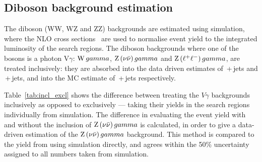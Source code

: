 \subsection{Diboson background estimation}
The diboson (WW, WZ and ZZ) backgrounds are estimated using simulation, where the NLO cross sections~\cite{MCFM:diboson} are used to normalise event yield to the integrated luminosity of the search regions. 
The diboson backgrounds where one of the bosons is a photon V$\gamma$: $\mathrm{W}\,gamma$, $\mathrm{Z}\, ( \nu \bar{\nu} )\, gamma$ and $\mathrm{Z}\, ( \ell^{+} \ell^{-} )\, gamma$, are treated inclusively: they are absorbed into the data driven estimates of \W\,+\,jets and \znunubr\,+\,jets, 
and into the MC estimate of \zellellbr\,+\,jets respectively. 

Table~\ref{tab:incl_excl} shows the difference between treating the $V\gamma$ backgrounds inclusively as opposed to exclusively --- taking their yields in the search regions individually from simulation.
The difference in evaluating the \znunubr event yield with and without the inclusion of $\mathrm{Z}\, ( \nu \bar{\nu} )\, gamma$ is calculated, in order to give a data-driven estimation of the $\mathrm{Z}\, ( \nu \bar{\nu} )\, gamma$ background.
This method is compared to the yield from using simulation directly, and agrees within the 50\% uncertainty assigned to all numbers taken from simulation.

